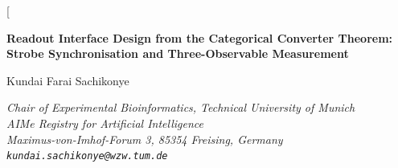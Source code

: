 \documentclass[11pt,twocolumn,a4paper]{article}
\theoremstyle{definition}
\theoremstyle{remark}
\begin{document}
\twocolumn[
\begin{@twocolumnfalse}
\begin{center}

{\LARGE\bfseries Readout Interface Design from the Categorical Converter Theorem:\\[4pt]
Strobe Synchronisation and Three-Observable Measurement}

\vspace{12pt}

{\large Kundai Farai Sachikonye}

\vspace{6pt}

{\small\itshape Chair of Experimental Bioinformatics, Technical University of Munich \\[0.3em]
\small\itshape AIMe Registry for Artificial Intelligence \\[0.2em]
\small\itshape Maximus-von-Imhof-Forum 3, 85354 Freising, Germany \\[0.2em]
\texttt{kundai.sachikonye@wzw.tum.de}}

\vspace{6pt}{\small May 2026}

\vspace{16pt}


\end{center}
\end{@twocolumnfalse}
\end{document}
